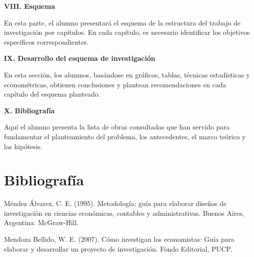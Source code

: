 \documentclass[
  letterpaper,
  DIV=11,
  numbers=noendperiod]{scrartcl}
\begin{document}
\textbf{VIII. Esquema}

En esta parte, el alumno presentará el esquema de la estructura del
trabajo de investigación por capítulos. En cada capítulo, es necesario
identificar los objetivos específicos correspondientes.

\textbf{IX. Desarrollo del esquema de investigación}

En esta sección, los alumnos, basándose en gráficos, tablas, técnicas
estadísticas y econométricas, obtienen conclusiones y plantean
recomendaciones en cada capítulo del esquema planteado.

\textbf{X. Bibliografía}

Aquí el alumno presenta la lista de obras consultadas que han servido
para fundamentar el planteamiento del problema, los antecedentes, el
marco teórico y las hipótesis.

\hypertarget{bibliografuxeda}{%
\section{Bibliografía}\label{bibliografuxeda}}

Méndez Álvarez, C. E. (1995). Metodología: guía para elaborar diseños de
investigación en ciencias económicas, contables y administrativas.
Buenos Aires, Argentina: McGraw-Hill.

Mendoza Bellido, W. E. (2007). Cómo investigan los economistas: Guía
para elaborar y desarrollar un proyecto de investigación. Fondo
Editorial, PUCP.


\printbibliography
\end{document}
